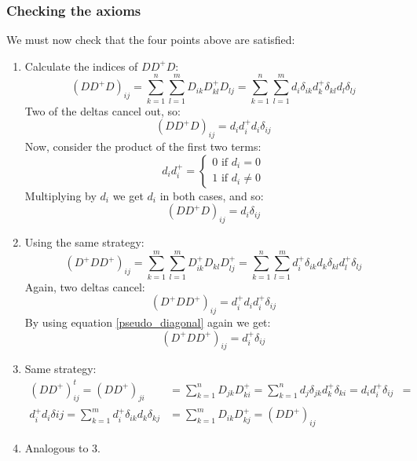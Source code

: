 \documentclass[12pt, a4paper]{article}
\numberwithin{equation}{section}
\begin{document}
\subsubsection{Checking the axioms}
We must now check that the four points above are satisfied:
\begin{enumerate}
\item Calculate the indices of $DD^+ D$:
\begin{equation}
(DD^+ D)_{ij}=\sum_{k=1}^n\sum_{l=1}^m D_{ik}D^+_{kl}D_{lj}=\sum_{k=1}^n\sum_{l=1}^m d_i\delta_{ik}d_k^+\delta_{kl}d_l\delta_{lj}
\end{equation}
Two of the deltas cancel out, so:
\begin{equation}
(DD^+ D)_{ij}=d_i d^+_i d_i\delta_{ij}
\end{equation}
Now, consider the product of the first two terms:
\begin{equation}
\label{pseudo_diagonal}
d_i d^+_i=
\begin{cases}
0\textrm{ if }d_i=0 \\
1\textrm{ if }d_i\neq 0
\end{cases}
\end{equation}
Multiplying by $d_i$ we get $d_i$ in both cases, and so:
\begin{equation}
(DD^+ D)_{ij}=d_i\delta_{ij}
\end{equation}

\item Using the same strategy:
\begin{equation}
(D^+ DD^+)_{ij}=\sum_{k=1}^m\sum_{l=1}^m D^+_{ik}D_{kl}D^+_{lj}=\sum_{k=1}^n\sum_{l=1}^m d_i^+\delta_{ik}d_k\delta_{kl}d_l^+\delta_{lj}
\end{equation}
Again, two deltas cancel:
\begin{equation}
(D^+ DD^+)_{ij}=d_i^+ d_i d_i^+\delta_{ij}
\end{equation}
By using equation \ref{pseudo_diagonal} again we get:
\begin{equation}
(D^+ DD^+)_{ij}=d_i^+\delta_{ij}
\end{equation}

\item Same strategy:
\begin{align}
(DD^+)^t_{ij}=(DD^+)_{ji}&=\sum_{k=1}^n D_{jk}D^+_{ki}=\sum_{k=1}^n d_j\delta_{jk}d^+_k\delta_{ki}=d_i d^+_i\delta_{ij}&=\\
d^+_i d_i\delta{ij}=\sum_{k=1}^m d^+_i\delta_{ik}d_k\delta_{kj}&=\sum_{k=1}^m D_{ik}D^+_{kj}=(DD^+)_{ij}
\end{align}

\item Analogous to 3.
\end{enumerate}
\end{document}
